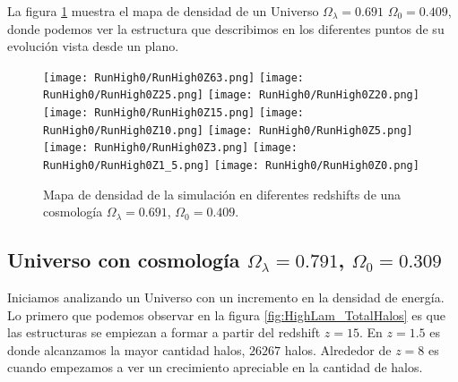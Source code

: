 La figura \ref{fig:High0-DensityMap} muestra el mapa de densidad de un Universo $\Omega_\lambda = 0.691$ $\Omega_0 = 0.409$, donde podemos ver la estructura que describimos en los diferentes puntos de su evolución vista desde un plano.
\begin{figure}[H]
    \centering

    \texttt{[image: RunHigh0/RunHigh0Z63.png]}   %
    \texttt{[image: RunHigh0/RunHigh0Z25.png]}   %
    \texttt{[image: RunHigh0/RunHigh0Z20.png]}   %
    \\
    \texttt{[image: RunHigh0/RunHigh0Z15.png]}   %
    \texttt{[image: RunHigh0/RunHigh0Z10.png]}   %
    \texttt{[image: RunHigh0/RunHigh0Z5.png]}    %
    \\
    \texttt{[image: RunHigh0/RunHigh0Z3.png]}    %
    \texttt{[image: RunHigh0/RunHigh0Z1\_5.png]}  %
    \texttt{[image: RunHigh0/RunHigh0Z0.png]}    %
    \caption[Mapa de densidad en en diferentes redshift]{ \footnotesize Mapa de densidad de la simulación en diferentes redshifts de una cosmología $\Omega_\lambda = 0.691$, $\Omega_0 = 0.409$. }
    \label{fig:High0-DensityMap}
\end{figure}


\subsection{Universo con cosmología \texorpdfstring{$\Omega_\lambda = 0.791$, $\Omega_0 = 0.309$ }{Omega lambda = 0.791, Omega 0 = 0.409}  }

Iniciamos analizando un Universo con un incremento en la densidad de energía. Lo primero que podemos observar en la figura \ref{fig:HighLam_TotalHalos} es que las estructuras se empiezan a formar a partir del redshift $z=15$. En $z= 1.5$ es donde alcanzamos la mayor cantidad halos, $26267$ halos. Alrededor de $z = 8$ es cuando empezamos a ver un crecimiento apreciable en la cantidad de halos.

